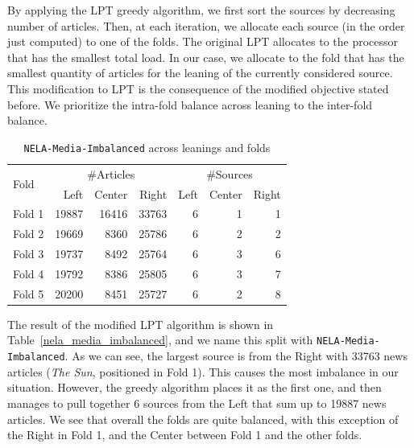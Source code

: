 By applying the LPT greedy algorithm, we first sort the sources by decreasing number of articles. Then, at each iteration, we allocate each source (in the order just computed) to one of the folds. The original LPT allocates to the processor that has the smallest total load. In our case, we allocate to the fold that has the smallest quantity of articles for the leaning of the currently considered source.
This modification to LPT is the consequence of the modified objective stated before.
We prioritize the intra-fold balance across leaning to the inter-fold balance.



\begin{table}[!htbp]
    \centering
    \begin{tabular}{l|rrr|rrr}
        \multirow{2}{*}{Fold} & \multicolumn{3}{c}{\#Articles} & \multicolumn{3}{c}{\#Sources} \\
         & Left & Center & Right & Left & Center & Right \\
        \hline
        Fold 1 & 19887 & 16416 & 33763 & 6 & 1 & 1 \\
        Fold 2 & 19669 & 8360 & 25786 & 6 & 2 & 2 \\
        Fold 3 & 19737 & 8492 & 25764 & 6 & 3 & 6 \\
        Fold 4 & 19792 & 8386 & 25805 & 6 & 3 & 7 \\
        Fold 5 & 20200 & 8451 & 25727 & 6 & 2 & 8 \\
    \end{tabular}
    \caption{\texttt{NELA-Media-Imbalanced} across leanings and folds}
    \label{tab:nela_media_imbalanced}
\end{table}

The result of the modified LPT algorithm is shown in Table~\ref{nela_media_imbalanced}, and we name this split with \texttt{NELA-Media-Imbalanced}.
As we can see, the largest source is from the Right with 33763 news articles (\emph{The Sun}, positioned in Fold 1). This causes the most imbalance in our situation. However, the greedy algorithm places it as the first one, and then manages to pull together 6 sources from the Left that sum up to 19887 news articles.
We see that overall the folds are quite balanced, with this exception of the Right in Fold 1, and the Center between Fold 1 and the other folds.

